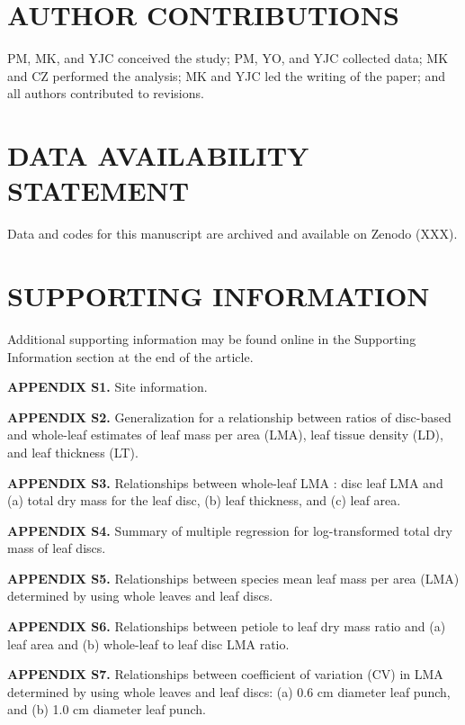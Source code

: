 \documentclass[
  12pt,
  a4paper,
,tablecaptionabove
]{scrartcl}
\begin{document}
\hypertarget{author-contributions}{%
\section{AUTHOR CONTRIBUTIONS}\label{author-contributions}}

PM, MK, and YJC conceived the study;
PM, YO, and YJC collected data;
MK and CZ performed the analysis;
MK and YJC led the writing of the paper; and
all authors contributed to revisions.

\hypertarget{data-availability-statement}{%
\section{DATA AVAILABILITY STATEMENT}\label{data-availability-statement}}

Data and codes for this manuscript are archived and available on Zenodo (XXX).

\hypertarget{supporting-information}{%
\section{SUPPORTING INFORMATION}\label{supporting-information}}

Additional supporting information may be found online in the Supporting Information section at the end of the article.

\textbf{APPENDIX S1.}
Site information.

\textbf{APPENDIX S2.}
Generalization for a relationship between ratios of disc-based and whole-leaf estimates of leaf mass per area (LMA), leaf tissue density (LD), and leaf thickness (LT).

\textbf{APPENDIX S3.}
Relationships between whole-leaf LMA : disc leaf LMA and (a) total dry mass for the leaf disc, (b) leaf thickness, and (c) leaf area.

\textbf{APPENDIX S4.}
Summary of multiple regression for log-transformed total dry mass of leaf discs.

\textbf{APPENDIX S5.}
Relationships between species mean leaf mass per area (LMA) determined by using whole leaves and leaf discs.

\textbf{APPENDIX S6.}
Relationships between petiole to leaf dry mass ratio and (a) leaf area and (b) whole-leaf to leaf disc LMA ratio.

\textbf{APPENDIX S7.}
Relationships between coefficient of variation (CV) in LMA determined by using whole leaves and leaf discs: (a) 0.6 cm diameter leaf punch, and (b) 1.0 cm diameter leaf punch.
\end{document}
